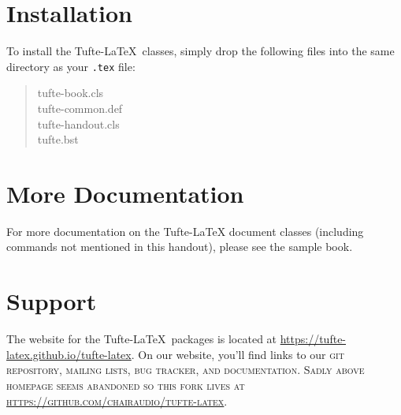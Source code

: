 \documentclass[nobib]{tufte-handout}
\newcommand{\textls}[2][5]{%
		\begingroup\addfontfeatures{LetterSpace=#1}#2\endgroup
	}
\renewcommand{\smallcapsspacing}[1]{\textls[10]{#1}}
\renewcommand{\smallcaps}[1]{\smallcapsspacing{\scshape\MakeTextLowercase{#1}}}
\begin{document}
\section{Installation}\label{sec:installation}
To install the Tufte-\LaTeX\ classes, simply drop the
following files into the same directory as your \texttt{.tex}
file:
\begin{quote}
  \ttfamily
  tufte-book.cls\\
  tufte-common.def\\
  tufte-handout.cls\\
  tufte.bst
\end{quote}




\section{More Documentation}\label{sec:more-doc}
For more documentation on the Tufte-\LaTeX{} document classes (including commands not
mentioned in this handout), please see the sample book.

\section{Support}\label{sec:support}

The website for the Tufte-\LaTeX\ packages is located at
\url{https://tufte-latex.github.io/tufte-latex}.  On our website, you'll find
links to our \smallcaps{git} repository, mailing lists, bug tracker, and documentation.
Sadly above homepage seems abandoned so this fork lives at \url{https://github.com/chairaudio/tufte-latex}.
\end{document}
